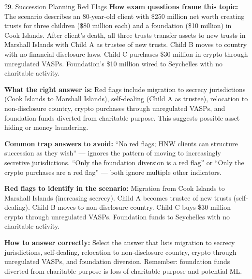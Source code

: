 \documentclass[11pt,a4paper]{beamer}
\begin{document}
	\begin{frame}{29. Succession Planning Red Flags}
		\tiny
		\noindent\textbf{How exam questions frame this topic:} The scenario describes an 80-year-old client with \$250 million net worth creating trusts for three children (\$80 million each) and a foundation (\$10 million) in Cook Islands. After client's death, all three trusts transfer assets to new trusts in Marshall Islands with Child A as trustee of new trusts. Child B moves to country with no financial disclosure laws. Child C purchases \$30 million in crypto through unregulated VASPs. Foundation's \$10 million wired to Seychelles with no charitable activity.
		
		\vspace{0.1cm}
		\noindent\textbf{What the right answer is:} Red flags include migration to secrecy jurisdictions (Cook Islands to Marshall Islands), self-dealing (Child A as trustee), relocation to non-disclosure country, crypto purchases through unregulated VASPs, and foundation funds diverted from charitable purpose. This suggests possible asset hiding or money laundering.
		
		\vspace{0.1cm}
		\noindent\textbf{Common trap answers to avoid:} “No red flags; HNW clients can structure succession as they wish” — ignores the pattern of moving to increasingly secretive jurisdictions. “Only the foundation diversion is a red flag” or “Only the crypto purchases are a red flag” — both ignore multiple other indicators.
		
		\vspace{0.1cm}
		\noindent\textbf{Red flags to identify in the scenario:} Migration from Cook Islands to Marshall Islands (increasing secrecy). Child A becomes trustee of new trusts (self-dealing). Child B moves to non-disclosure country. Child C buys \$30 million crypto through unregulated VASPs. Foundation funds to Seychelles with no charitable activity.
		
		\vspace{0.1cm}
		\noindent\textbf{How to answer correctly:} Select the answer that lists migration to secrecy jurisdictions, self-dealing, relocation to non-disclosure country, crypto through unregulated VASPs, and foundation diversion. Remember: foundation funds diverted from charitable purpose is loss of charitable purpose and potential ML.
	\end{frame}
	
\end{document}
